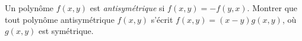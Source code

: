 Un polynôme $f(x, y)$ est \emph{antisymétrique} si $f(x, y) = -f(y, x)$. Montrer que tout polynôme antisymétrique $f(x, y)$ s'écrit $f(x, y) = (x - y)g(x, y)$, où $g(x, y)$ est symétrique.
